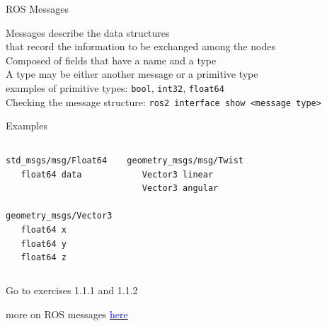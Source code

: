 \documentclass[compress]{beamer}
\newcommand{\link}[2]{\href{#1}{\underline{\textcolor{blue}{#2}}}}
\begin{document}
\begin{frame}{ROS Messages}

  \footnotesize
 
 Messages describe the data structures \\ {\ssmall that record the information to be exchanged among the nodes}\\%
 
 Composed of fields that have a name and a type \\ 
 
 
 A type may be either another message or a primitive type\\
 {\tiny examples of primitive types: \texttt{bool}, \texttt{int32}, \texttt{float64}}\\
 
 
 Checking the message structure: \texttt{ros2 interface show \textless message type\textgreater\ }
 
 \vspace{.25cm}
 \begin{block}{{\ssmall Examples}}
 \ssmall
 \begin{columns}
  \texttt{std\_msgs/msg/Float64}\\
  \texttt{\ \ \ float64 data} \\
  \ \\
  \ \\
  \texttt{geometry\_msgs/Vector3}\\
  \texttt{\ \ \ float64 x\\
          \ \ \ float64 y\\
          \ \ \ float64 z}
  
  \texttt{geometry\_msgs/msg/Twist}\\
  \texttt{\ \ \ Vector3  linear\\  
   \ \ \ Vector3  angular}\\
\ \\

 \end{columns}
\end{block}

{\tiny Go to exercises 1.1.1 and 1.1.2}

\vfill

{\fontsize{4}{4.8}\selectfont more on ROS messages \link{https://docs.ros.org/en/foxy/Concepts/About-ROS-Interfaces.html}{here}}
\end{frame}
\end{document}
